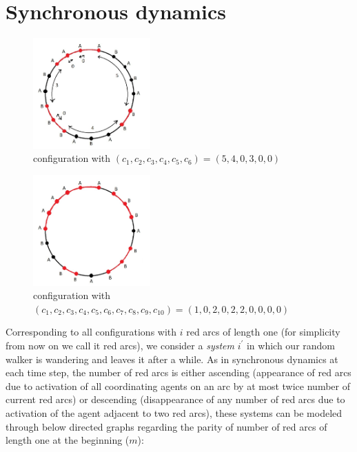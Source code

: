 \documentclass[]{book}
\theoremstyle{definition}
\begin{document}
\section{Synchronous dynamics}
\begin{figure}[H]
    \centering\includegraphics[width=0.4\textwidth]{figures/pic2.jpg}
    \caption{configuration with $\left(c_{1}, c_{2}, c_{3}, c_{4}, c_{5}, c_{6}\right) = \left(5, 4, 0, 3, 0, 0\right)$}
\end{figure}
\begin{figure}[H]
    \centering
    \includegraphics[width=0.4\textwidth]{figures/sync.jpg}
    \caption{configuration with $\left(c_{1}, c_{2}, c_{3}, c_{4}, c_{5}, c_{6}, c_{7}, c_{8}, c_{9}, c_{10}\right) = \left(1, 0, 2, 0, 2, 2, 0, 0, 0, 0\right)$}
\end{figure}

Corresponding to all configurations with $i$ red arcs of length one (for simplicity from now on we call it red arcs), we consider a \emph{system} $i^\prime$ in which our random walker is wandering and leaves it after a while. As in synchronous dynamics at each time step, the number of red arcs is either ascending (appearance of red arcs due to activation of all coordinating agents on an arc by at most twice number of current red arcs) or descending (disappearance of any number of red arcs due to activation of the agent adjacent to two red arcs), these systems can be modeled through below directed graphs regarding the parity of number of red arcs of length one at the beginning ($m$):
\end{document}
